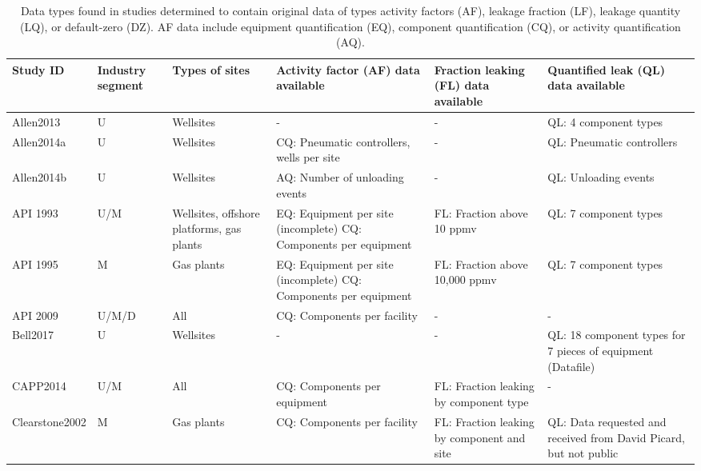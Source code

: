 \documentclass[11pt]{report}
\begin{document}
\begin{landscape}
\begin{table}[]
\begin{scriptsize}
\caption{Data types found in studies determined to contain original data of types activity factors (AF), leakage fraction (LF), leakage quantity (LQ), or default-zero (DZ). AF data include equipment quantification (EQ), component quantification (CQ), or activity quantification (AQ). }
\label{tab:VF_component_data_by_study}
\begin{tabular*}{1\columnwidth}{p{}p{}p{}p{}p{}p{}}
\toprule
Study ID   			& Industry segment    & Types of sites        	& Activity factor (AF) data available  		& Fraction leaking (FL) data available      					& Quantified leak (QL) data available   \\
\midrule
Allen2013  		& U        			& Wellsites    			& -      							& - 												& QL: 4 component types       \\
Allen2014a         	& U         			& Wellsites    			& CQ: Pneumatic controllers, wells per site       & - 									& QL: Pneumatic controllers   \\
Allen2014b        	& U         			& Wellsites    			& AQ: Number of unloading events       	& - 												& QL: Unloading events        \\
API 1993         		& U/M       		& Wellsites, offshore platforms, gas plants  & EQ: Equipment per site (incomplete) CQ: Components per equipment   & FL: Fraction above 10 ppmv  & QL: 7 component types        \\
API 1995        		& M        			& Gas plants   			& EQ: Equipment per site (incomplete) CQ: Components per equipment  &FL: Fraction above 10,000 ppmv      & QL: 7 component types        \\
API 2009         		& U/M/D     		& All					& CQ: Components per facility			& - 												& -       \\
Bell2017         		& U         			& Wellsites   			& -      							& - 												& QL: 18 component types for 7 pieces of equipment (Datafile)         \\
CAPP2014      		& U/M      			& All         				& CQ: Components per equipment      	& FL: Fraction leaking by component type   				& -       \\
Clearstone2002       	& M         			& Gas plants   			& CQ: Components per facility			& FL: Fraction leaking by component and site				& QL: Data requested and received from David Picard, but not public \\

\end{tabular*}
\end{scriptsize}
\end{table}
\end{landscape}
\end{document}

